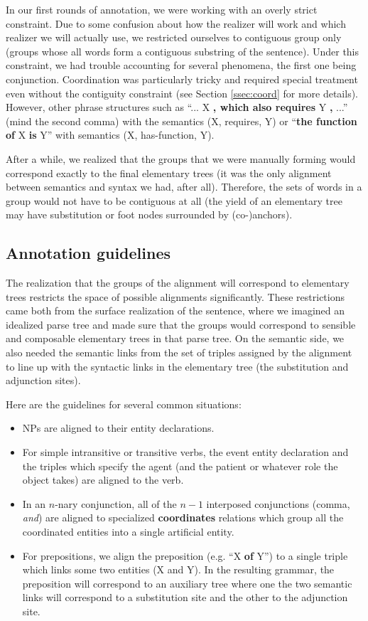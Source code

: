 \documentclass[a4paper]{article}
\begin{document}
In our first rounds of annotation, we were working with an overly
strict constraint. Due to some confusion about how the realizer will
work and which realizer we will actually use, we restricted ourselves
to contiguous group only (groups whose all words form a contiguous
substring of the sentence). Under this constraint, we had trouble
accounting for several phenomena, the first one being conjunction.
Coordination was particularly tricky and required special treatment
even without the contiguity constraint (see Section \ref{ssec:coord}
for more details). However, other phrase structures such as ``... X
\textbf{, which also requires} Y \textbf{,} ...'' (mind the second
comma) with the semantics (X, requires, Y) or ``\textbf{the function
of} X \textbf{is} Y'' with semantics (X, has-function, Y).

After a while, we realized that the groups that we were manually
forming would correspond exactly to the final elementary trees (it was
the only alignment between semantics and syntax we had, after all).
Therefore, the sets of words in a group would not have to be
contiguous at all (the yield of an elementary tree may have
substitution or foot nodes surrounded by (co-)anchors).

\subsection{Annotation guidelines}

The realization that the groups of the alignment will correspond to
elementary trees restricts the space of possible alignments
significantly. These restrictions came both from the surface
realization of the sentence, where we imagined an idealized parse tree
and made sure that the groups would correspond to sensible and
composable elementary trees in that parse tree. On the semantic side,
we also needed the semantic links from the set of triples assigned by
the alignment to line up with the syntactic links in the elementary
tree (the substitution and adjunction sites).

Here are the guidelines for several common situations:

\begin{itemize}
\item NPs are aligned to their entity declarations.
\item For simple intransitive or transitive verbs, the event entity
  declaration and the triples which specify the agent (and the
  patient or whatever role the object takes) are aligned to the verb.
\item In an $n$-nary conjunction, all of the $n-1$ interposed
  conjunctions (comma, \emph{and}) are aligned to specialized
  \textbf{coordinates} relations which group all the coordinated
  entities into a single artificial entity.
\item For prepositions, we align the preposition (e.g. ``X \textbf{of}
  Y'') to a single triple which links some two entities (X and Y). In
  the resulting grammar, the preposition will correspond to an
  auxiliary tree where one the two semantic links will correspond to a
  substitution site and the other to the adjunction site.
\end{itemize}
\end{document}
